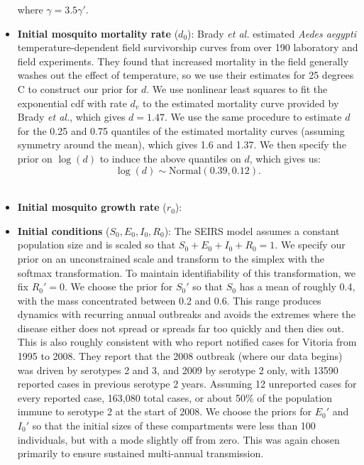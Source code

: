 \documentclass[10pt,letterpaper]{article}
\begin{document}
\begin{itemize}
where $\gamma = 3.5\gamma'$.
\\
\item \textbf{Initial mosquito mortality rate} ($d_0$): Brady \textit{et al.} \cite{Brady2013} estimated \textit{Aedes aegypti} temperature-dependent field survivorship curves from over 190 laboratory and field experiments.
They found that increased mortality in the field generally washes out the effect of temperature, so we use their estimates for 25 degrees C to construct our prior for $d$.  
We use nonlinear least squares to fit the exponential cdf with rate $d_v$ to the estimated mortality curve provided by Brady \textit{et al.}, which gives $d = 1.47$.
We use the same procedure to estimate $d$ for the 0.25 and 0.75 quantiles of the estimated mortality curves (assuming symmetry around the mean), which gives 1.6 and 1.37.
We then specify the prior on $\log(d)$ to induce the above quantiles on $d$, which gives us:
\begin{equation}
\log(d) \sim \text{Normal}(0.39, 0.12).
\end{equation}
\\
\item \textbf{Initial mosquito growth rate} ($r_0$):
\\
\item \textbf{Initial conditions} ($S_0, E_0, I_0, R_0$): The SEIRS model assumes a constant population size and is scaled so that $S_0+E_0+I_0+R_0 = 1$.
We specify our prior on an unconstrained scale and transform to the simplex with the softmax transformation.
To maintain identifiability of this transformation, we fix $R_0' = 0$.
We choose the prior for $S_0'$  so that $S_0$ has a mean of roughly  0.4, with the mass concentrated between 0.2 and 0.6.
This range produces dynamics with recurring annual outbreaks and avoids the extremes where the disease either does not spread or spreads far too quickly and then dies out.
This is also roughly consistent with \cite{Cardoso2011a} who report notified cases for Vitoria from 1995 to 2008. 
They report that the 2008 outbreak (where our data begins) was driven by serotypes 2 and 3, and 2009 by serotype 2 only, with 13590 reported cases in previous serotype 2 years.
Assuming 12 unreported cases for every reported case, 163,080 total cases, or about 50\% of the population immune to serotype 2 at the start of 2008.
We choose the priors for $E_0'$ and $I_0'$ so that the initial sizes of these compartments were less than 100 individuals, but with a mode slightly off from zero.
This was again chosen primarily to ensure sustained multi-annual transmission.

\end{itemize}
\end{document}
